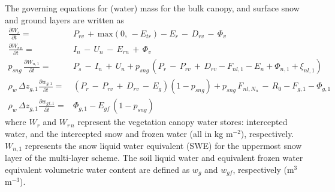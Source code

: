 The governing equations for (water) mass for the bulk canopy, and
surface snow and ground layers are written as
%
\begin{align}
%
\label{eq:meb_dwrvdt}
{\frac {\partial W_{r}}{\partial t}} = & 
 P_{rv} \,+\, {\mathrm{max}}\left(0, \, -E_{tr}\right) 
- E_{r} \,-\, D_{rv} \,-\, \Phi_{v}
\\
%
\label{eq:meb_dtwrnvdt}
{\frac {\partial W_{r\,n}}{\partial t}} = & 
I_{n} \,-\, U_{n} \,-\, E_{rn} \,+\, \Phi_{v}
%
\\
%
\label{eq:meb_dtwndt}
%
p_{sng} \, {\frac {\partial W_{n,1}}{\partial t}} = & P_s \,-\, 
I_{n} \,+\, U_{n} + 
p_{sng} \, \left(
P_r \,-\, P_{rv} \,+\, D_{rv}
- F_{nl,1} - E_n
+ \Phi_{n,1}
+ \xi_{nl,1} 
\right)
\\
%
\label{eq:meb_dtwgdt} 
\rho_w \, \Delta z_{g,1} {\frac {\partial w_{g,1}}{\partial t}} = & 
\left( P_r \,-\, P_{rv} \,+\, D_{rv} \,-\, E_g\right)
\left(1 - p_{sng}\right) 
+ p_{sng}\,F_{nl,N_n} 
\,-\, R_0 - F_{g,1} - \Phi_{g,1} 
\\
%
\label{eq:meb_dtwgfdt}
\rho_w \, \Delta z_{g,1} {\frac {\partial w_{gf,1}}{\partial t}} = &
\Phi_{g,1} - E_{gf}\,\left(1 - p_{sng}\right)   
%
\end{align}
%
where $W_{r}$
and $W_{r\,n}$ represent the vegetation
canopy water stores: intercepted water, 
and the intercepted snow and frozen water (all in kg m$^{-2}$), respectively.
$W_{n,1}$ represents the snow liquid water equivalent (SWE) for the
uppermost
snow layer of the multi-layer scheme.
The soil liquid water and equivalent frozen water equivalent
volumetric water
content are defined as $w_g$ and $w_{gf}$, respectively (m$^3$
m$^{-3}$). 


